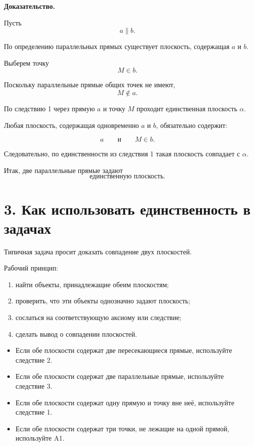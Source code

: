 \documentclass[a4paper,12pt]{article}
\begin{document}
\textbf{Доказательство.}

Пусть
\[
a\parallel b.
\]

По определению параллельных прямых существует плоскость,
содержащая $a$ и $b$.

Выберем точку
\[
M\in b.
\]

Поскольку параллельные прямые общих точек не имеют,
\[
M\notin a.
\]

По следствию 1 через прямую $a$ и точку $M$
проходит единственная плоскость $\alpha$.

Любая плоскость, содержащая одновременно $a$ и $b$,
обязательно содержит:

\[
a
\qquad\text{и}\qquad
M\in b.
\]

Следовательно, по единственности из следствия 1
такая плоскость совпадает с $\alpha$.

Итак, две параллельные прямые задают
\[
\boxed{\text{единственную плоскость}}.
\]


\section*{3. Как использовать единственность в задачах}

Типичная задача просит доказать совпадение
двух плоскостей.

Рабочий принцип:

\begin{enumerate}
    \item найти объекты, принадлежащие обеим плоскостям;
    \item проверить, что эти объекты однозначно задают плоскость;
    \item сослаться на соответствующую аксиому или следствие;
    \item сделать вывод о совпадении плоскостей.
\end{enumerate}

\begin{itemize}
    \item Если обе плоскости содержат две пересекающиеся прямые,
    используйте следствие 2.

    \item Если обе плоскости содержат две параллельные прямые,
    используйте следствие 3.

    \item Если обе плоскости содержат одну прямую
    и точку вне неё, используйте следствие 1.

    \item Если обе плоскости содержат три точки,
    не лежащие на одной прямой, используйте A1.
\end{itemize}
\end{document}
